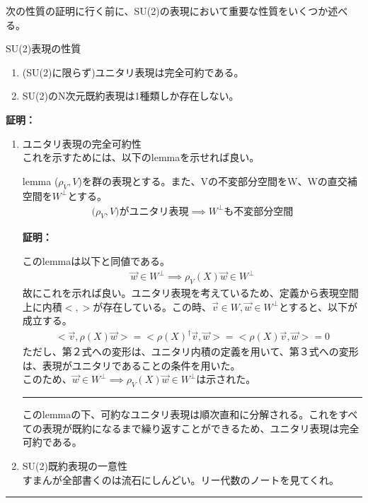 \documentclass[dvipdfmx,a4paper,10.5pt]{article}
\numberwithin{equation}{section}
\newenvironment{proofbox}
{\begin{prooflabel}\textbf{証明：}\end{prooflabel}\vspace{0.8em}}
{\par\vspace{1em}\hrule\vspace{1em}}
\begin{document}
次の性質の証明に行く前に、SU(2)の表現において重要な性質をいくつか述べる。
\begin{resultbox}{SU(2)表現の性質}
    \begin{enumerate}
    \item (SU(2)に限らず)ユニタリ表現は完全可約である。
    \item SU(2)のN次元既約表現は1種類しか存在しない。
    \end{enumerate}
\end{resultbox}
\begin{proofbox}
    \begin{enumerate}
        \item ユニタリ表現の完全可約性\\
        これを示すためには、以下のlemmaを示せれば良い。
        \begin{theorembox}{lemma}
        ($\rho_{V},V$)を群の表現とする。また、Vの不変部分空間をW、Wの直交補空間を$W^{\perp}$とする。
        \begin{align*}
            \text{($\rho_{V},V$)がユニタリ表現}\implies \text{$W^{\perp}$も不変部分空間}
        \end{align*}
        \end{theorembox}
        \begin{proofbox}
            このlemmaは以下と同値である。
            \begin{align*}
                \vec{w}\in W^{\perp}\implies \rho_{V}(X)\vec{w}\in W^{\perp}
            \end{align*}
            故にこれを示れば良い。ユニタリ表現を考えているため、定義から表現空間上に内積$<,>$が存在している。この時、$\vec{v}\in W,\vec{w}\in W^{\perp}$とすると、以下が成立する。
            \begin{align*}
                <\vec{v},\rho(X)\vec{w}>=<\rho(X)^{\dagger}\vec{v},\vec{w}>=<\rho(X)\vec{v},\vec{w}>=0
            \end{align*}
            ただし、第２式への変形は、ユニタリ内積の定義を用いて、第３式への変形は、表現がユニタリであることの条件を用いた。\\
            このため、$\vec{w}\in W^{\perp}\implies \rho_{V}(X)\vec{w}\in W^{\perp}$は示された。
        \end{proofbox}
        このlemmaの下、可約なユニタリ表現は順次直和に分解される。これをすべての表現が既約になるまで繰り返すことができるため、ユニタリ表現は完全可約である。
        \item SU(2)既約表現の一意性\\
        すまんが全部書くのは流石にしんどい。リー代数のノートを見てくれ。
    \end{enumerate}
\end{proofbox}
\end{document}
